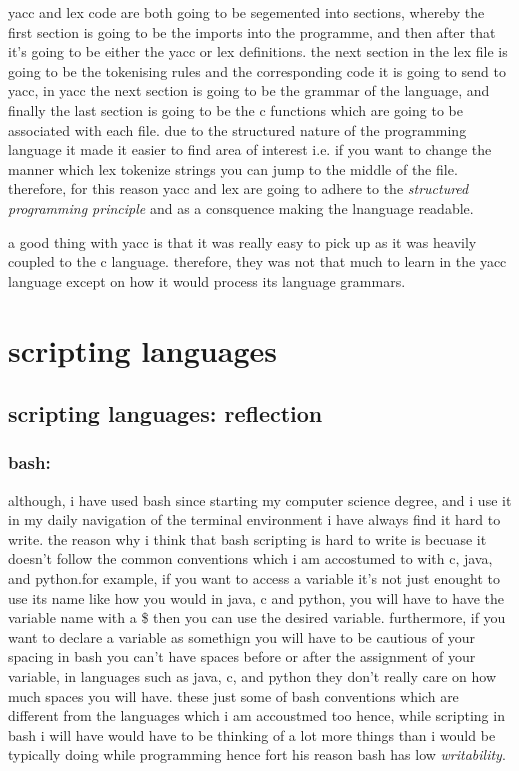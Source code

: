 \documentclass[
	12pt, %
]{fphw}
\begin{document}
yacc and lex code are both going to be segemented into sections, whereby the
first section is going to be the imports into the programme, and then after that
it's going to be either the yacc or lex definitions. the next section in the lex
file is going to be the tokenising rules and the corresponding code it is going
to send to yacc, in yacc the next section is going to be the grammar of the
language, and finally the last section is going to be the c functions which are
going to be associated with each file. due to the structured nature of the
programming language it made it easier to find area of interest i.e. if you want
to change the manner which lex tokenize strings you can jump to the middle of the
file. therefore, for this reason yacc and lex are going to adhere to the
\emph{structured programming principle} and as a consquence making the lnanguage
readable.\par

a good thing with yacc is that it was really easy to pick up as it was heavily
coupled to the c language. therefore, they was not that much to learn in the
yacc language except on how it would process its language grammars. \par

\section{scripting languages}


\subsection{scripting languages: reflection}

\subsubsection{bash:} although, i have used bash since starting my computer science
degree, and i use it in my daily navigation of the terminal environment i have
always find it hard to write. the reason why i think that bash scripting is hard
to write is becuase it doesn't follow the common conventions which i am accostumed
to with c, java, and python.for example, if you want to access a variable it's not
just enought to use its name like how you would in java, c and python, you will have
to have the variable name with a \$ then you can use the desired variable. furthermore,
if you want to declare a variable as somethign you will have to be cautious of your
spacing in bash you can't have spaces before or after the assignment of your variable,
in languages such as java, c, and python they don't really care on how much spaces you
will have. these just some of bash conventions which are different from the
languages which i am accoustmed too hence, while scripting in bash i will have
would have to be thinking of a lot more things than i would be typically doing
while programming hence fort his reason bash has low \emph{writability}. \par
\end{document}
